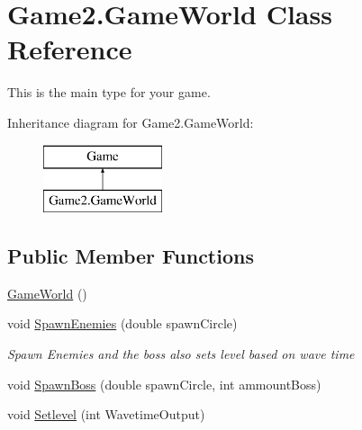 \hypertarget{class_game2_1_1_game_world}{}\section{Game2.\+Game\+World Class Reference}
\label{class_game2_1_1_game_world}


This is the main type for your game.  


Inheritance diagram for Game2.\+Game\+World\+:\begin{figure}[H]
\begin{center}
\leavevmode
\includegraphics[height=2.000000cm]{class_game2_1_1_game_world}
\end{center}
\end{figure}
\subsection*{Public Member Functions}
\begin{DoxyCompactItemize}
\item 
\mbox{\hyperlink{class_game2_1_1_game_world_acecdd046d813514fe4a381fac3392417}{Game\+World}} ()
\item 
void \mbox{\hyperlink{class_game2_1_1_game_world_a268f162de7a1df8df00d740342465e41}{Spawn\+Enemies}} (double spawn\+Circle)
\begin{DoxyCompactList}\small\item\em Spawn Enemies and the boss also sets level based on wave time \end{DoxyCompactList}\item 
void \mbox{\hyperlink{class_game2_1_1_game_world_aa7f3f55732bc5adbd85898bb55523bad}{Spawn\+Boss}} (double spawn\+Circle, int ammount\+Boss)
\item 
void \mbox{\hyperlink{class_game2_1_1_game_world_a562424129dedeb22c5cc98d7a3f45a70}{Setlevel}} (int Wavetime\+Output)
\end{DoxyCompactItemize}

